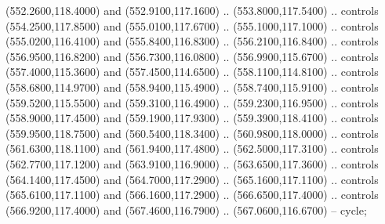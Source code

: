 {\begin{scope}[y=0.80pt, x=0.80pt, yscale=-1, xscale=1, inner sep=0pt, outer sep=0pt, #1]
      (552.2600,118.4000) and (552.9100,117.1600) .. (553.8000,117.5400) .. controls
      (554.2500,117.8500) and (555.0100,117.6700) .. (555.1000,117.1000) .. controls
      (555.0200,116.4100) and (555.8400,116.8300) .. (556.2100,116.8400) .. controls
      (556.9500,116.8200) and (556.7300,116.0800) .. (556.9900,115.6700) .. controls
      (557.4000,115.3600) and (557.4500,114.6500) .. (558.1100,114.8100) .. controls
      (558.6800,114.9700) and (558.9400,115.4900) .. (558.7400,115.9100) .. controls
      (559.5200,115.5500) and (559.3100,116.4900) .. (559.2300,116.9500) .. controls
      (558.9000,117.4500) and (559.1900,117.9300) .. (559.3900,118.4100) .. controls
      (559.9500,118.7500) and (560.5400,118.3400) .. (560.9800,118.0000) .. controls
      (561.6300,118.1100) and (561.9400,117.4800) .. (562.5000,117.3100) .. controls
      (562.7700,117.1200) and (563.9100,116.9000) .. (563.6500,117.3600) .. controls
      (564.1400,117.4500) and (564.7000,117.2900) .. (565.1600,117.1100) .. controls
      (565.6100,117.1100) and (566.1600,117.2900) .. (566.6500,117.4000) .. controls
      (566.9200,117.4000) and (567.4600,116.7900) .. (567.0600,116.6700) -- cycle;


\end{scope}}

